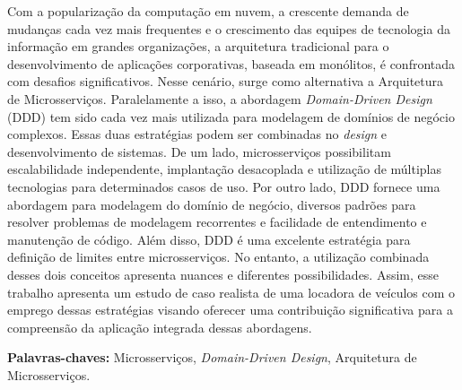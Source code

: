 \begin{resumo}



Com a popularização da computação em nuvem, a crescente demanda de mudanças cada vez mais frequentes e o crescimento das equipes de tecnologia da informação em grandes organizações, a arquitetura tradicional para o desenvolvimento de aplicações corporativas, baseada em monólitos, é confrontada com desafios significativos. Nesse cenário, surge como alternativa a Arquitetura de Microsserviços. Paralelamente a isso, a abordagem \textit{Domain-Driven Design} (DDD) tem sido cada vez mais utilizada para modelagem de domínios de negócio complexos. Essas duas estratégias podem ser combinadas no \textit{design} e desenvolvimento de sistemas. De um lado, microsserviços possibilitam escalabilidade independente, implantação desacoplada e utilização de múltiplas tecnologias para determinados casos de uso. Por outro lado, DDD fornece uma abordagem para modelagem do domínio de negócio, diversos padrões para resolver problemas de modelagem recorrentes e facilidade de entendimento e manutenção de código. Além disso, DDD é uma excelente estratégia para definição de limites entre microsserviços. No entanto, a utilização combinada desses dois conceitos apresenta nuances e diferentes possibilidades. Assim, esse trabalho apresenta um estudo de caso realista de uma locadora de veículos com o emprego dessas estratégias visando oferecer uma contribuição significativa para a compreensão da aplicação integrada dessas abordagens.

\textbf{Palavras-chaves: } Microsserviços, \textit{Domain-Driven Design}, Arquitetura de Microsserviços.  

\end{resumo}


